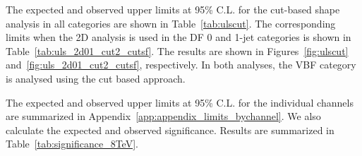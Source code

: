 The expected and observed upper limits at 95\% C.L.
for the cut-based shape analysis in all categories are shown in Table~\ref{tab:ulscut}.
The corresponding limits when the 2D analysis is used 
in the DF 0 and 1-jet categories is shown in Table~\ref{tab:uls_2d01_cut2_cutsf}.
The results are shown in Figures~\ref{fig:ulscut} 
and~\ref{fig:uls_2d01_cut2_cutsf}, respectively.
In both analyses, the VBF category is analysed using the cut based approach.

The expected and observed upper limits at 95\% C.L. for the individual channels 
are summarized in Appendix~\ref{app:appendix_limits_bychannel}. 
We also calculate the expected and observed significance.
Results are summarized in Table~\ref{tab:significance_8TeV}.



